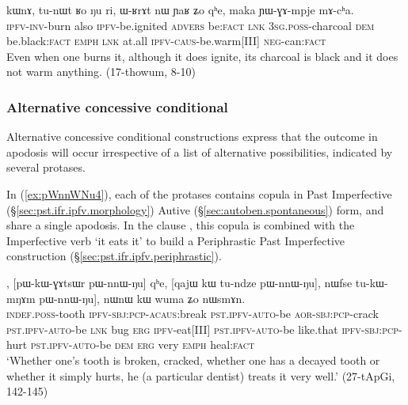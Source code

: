\begin{exe}
\ex \label{ex:chWwGnWBlW.kWnA}
  kɯnɤ, tu-nɯt ʁo ŋu ri, ɯ-ʁrɤt nɯ ɲaʁ ʑo qʰe, maka ɲɯ-ɣɤ-mpje mɤ-cʰa. \\
  \textsc{ipfv}-\textsc{inv}-burn also \textsc{ipfv}-be.ignited \textsc{advers} be:\textsc{fact} \textsc{lnk}
\textsc{3sg}.\textsc{poss}-charcoal \textsc{dem}  be.black:\textsc{fact} \textsc{emph} \textsc{lnk} at.all \textsc{ipfv}-\textsc{caus}-be.warm[III] \textsc{neg}-can:\textsc{fact} \\
 \glt Even when one burns it, although it does ignite, its charcoal is black and it does not warm anything. (17-thowum, 8-10)
\end{exe}
 
 \subsubsection{Alternative concessive conditional} \label{sec:alt.concessive.conditional}
Alternative concessive conditional constructions express that the outcome in apodosis will occur irrespective of a list of alternative possibilities, indicated by several protases. 


 In (\ref{ex:pWnnWNu4}), each of the protases contains copula  in Past Imperfective (§\ref{sec:pst.ifr.ipfv.morphology}) Autive (§\ref{sec:autoben.spontaneous}) form, and share a single apodosis. In the clause , this copula is combined with the Imperfective verb  `it eats it' to build a Periphrastic Past Imperfective construction (§\ref{sec:pst.ifr.ipfv.periphrastic}).

\begin{exe}
\ex  \label{ex:pWnnWNu4}
, [pɯ-kɯ-ɣɤtsɯr pɯ-nnɯ-ŋu] qʰe, [qajɯ kɯ tu-ndze pɯ-nnɯ-ŋu], nɯfse tu-kɯ-mŋɤm pɯ-nnɯ-ŋu], nɯnɯ kɯ wuma ʑo nɯsmɤn. \\
\textsc{indef}.\textsc{poss}-tooth \textsc{ipfv}-\textsc{sbj}:\textsc{pcp}-\textsc{acaus}:break \textsc{pst}.\textsc{ipfv}-\textsc{auto}-be
\textsc{aor}-\textsc{sbj}:\textsc{pcp}-crack \textsc{pst}.\textsc{ipfv}-\textsc{auto}-be \textsc{lnk}
bug \textsc{erg} \textsc{ipfv}-eat[III] \textsc{pst}.\textsc{ipfv}-\textsc{auto}-be 
like.that \textsc{ipfv}-\textsc{sbj}:\textsc{pcp}-hurt \textsc{pst}.\textsc{ipfv}-\textsc{auto}-be
\textsc{dem} \textsc{erg} very \textsc{emph} heal:\textsc{fact} \\
\glt `Whether one's tooth is broken, cracked, whether one has a decayed tooth or whether it simply hurts, he (a particular dentist) treats it very well.' (27-tApGi, 142-145)
\end{exe}

